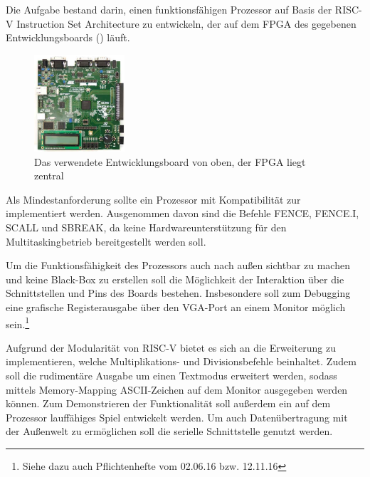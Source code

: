 

Die Aufgabe bestand darin, einen funktionsf\"ahigen Prozessor auf Basis der RISC-V Instruction Set Architecture zu entwickeln, der auf dem FPGA des gegebenen Entwicklungsboards () l\"auft.
\begin{figure}[H]
	\centering
		\includegraphics[width=0.3\textwidth]{Board.png}
	\caption{Das verwendete Entwicklungsboard von oben, der FPGA liegt zentral}
	\label{fig:board}
\end{figure}


Als Mindestanforderung sollte ein Prozessor mit Kompatibilit\"at zur  implementiert werden. Ausgenommen davon sind die Befehle FENCE, FENCE.I, SCALL und SBREAK, da keine Hardwareunterst\"utzung f\"ur den Multitaskingbetrieb bereitgestellt werden soll.

Um die Funktionsf\"ahigkeit des Prozessors auch nach au{\ss}en sichtbar zu machen und keine Black-Box zu erstellen soll die M\"oglichkeit der Interaktion \"uber die Schnittstellen und Pins des Boards bestehen. Insbesondere soll zum Debugging eine grafische Registerausgabe \"uber den VGA-Port an einem Monitor m\"oglich sein.\footnote{Siehe dazu auch Pflichtenhefte vom 02.06.16 bzw. 12.11.16}


Aufgrund der Modularit\"at von RISC-V bietet es sich an die Erweiterung  zu implementieren, welche Multiplikations- und Divisionsbefehle beinhaltet. Zudem soll die rudiment\"are Ausgabe um einen Textmodus erweitert werden, sodass mittels Memory-Mapping ASCII-Zeichen auf dem Monitor ausgegeben werden k\"onnen. Zum Demonstrieren der Funktionalit\"at soll au{\ss}erdem ein auf dem Prozessor lauff\"ahiges Spiel entwickelt werden. Um auch Daten\"ubertragung mit der Au{\ss}enwelt zu erm\"oglichen soll die serielle Schnittstelle genutzt werden.

